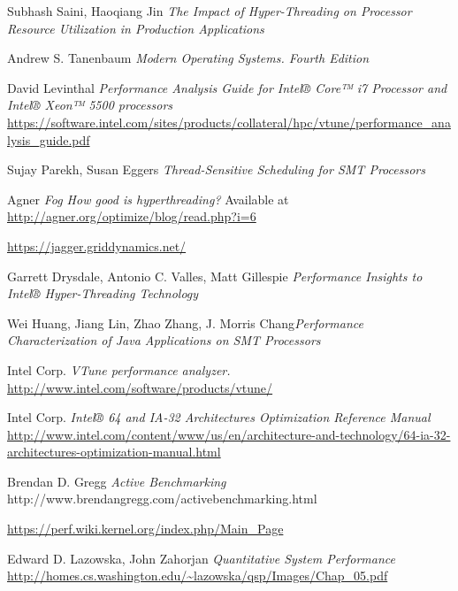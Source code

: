 \documentclass[12pt]{article}
\begin{document}



\begin{thebibliography}{1}

   Subhash Saini, Haoqiang Jin {\em The Impact of Hyper-Threading on Processor Resource Utilization in Production Applications}

   Andrew S. Tanenbaum {\em Modern Operating Systems. Fourth Edition}

   David Levinthal {\em Performance Analysis Guide for Intel® Core™ i7 Processor and Intel® Xeon™ 5500 processors} \url{https://software.intel.com/sites/products/collateral/hpc/vtune/performance_analysis_guide.pdf}
  
   Sujay Parekh, Susan Eggers {\em Thread-Sensitive Scheduling for SMT Processors}
  
   Agner {\em Fog How good is hyperthreading?} Available at \url{http://agner.org/optimize/blog/read.php?i=6}

   \url{https://jagger.griddynamics.net/}
  
   Garrett Drysdale, Antonio C. Valles, Matt Gillespie {\em Performance Insights to Intel® Hyper-Threading Technology}
  
  \bibitem{} Wei Huang, Jiang Lin, Zhao Zhang, J. Morris Chang{\em Performance Characterization of Java Applications on SMT Processors}
  
   Intel Corp. {\em VTune performance analyzer.} \url{http://www.intel.com/software/products/vtune/}
  
   Intel Corp. {\em Intel® 64 and IA-32 Architectures Optimization Reference Manual} \url{http://www.intel.com/content/www/us/en/architecture-and-technology/64-ia-32-architectures-optimization-manual.html}

   Brendan D. Gregg {\em Active Benchmarking} http://www.brendangregg.com/activebenchmarking.html
  
   \url{https://perf.wiki.kernel.org/index.php/Main_Page}
  
   Edward D. Lazowska, John Zahorjan {\em Quantitative System Performance} \url{http://homes.cs.washington.edu/~lazowska/qsp/Images/Chap_05.pdf}
    
\end{thebibliography}
\end{document}
